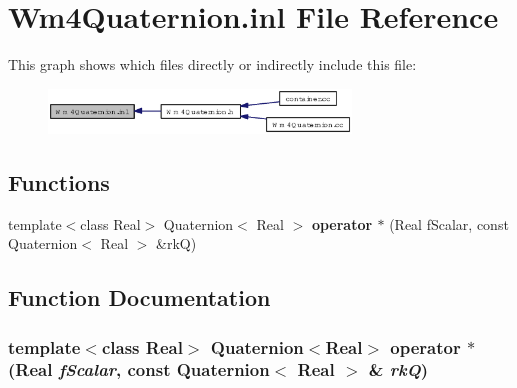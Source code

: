 \section{Wm4Quaternion.inl File Reference}
\label{Wm4Quaternion_8inl}


This graph shows which files directly or indirectly include this file:\begin{figure}[H]
\begin{center}
\leavevmode
\includegraphics[width=228pt]{Wm4Quaternion_8inl__dep__incl}
\end{center}
\end{figure}
\subsection*{Functions}
\begin{CompactItemize}
\item 
template$<$class Real$>$ Quaternion$<$ Real $>$ {\bf operator $\ast$} (Real f\-Scalar, const Quaternion$<$ Real $>$ \&rk\-Q)
\end{CompactItemize}


\subsection{Function Documentation}
\subsubsection{\setlength{\rightskip}{0pt plus 5cm}template$<$class Real$>$ Quaternion$<$Real$>$ operator $\ast$ (Real {\em f\-Scalar}, const Quaternion$<$ Real $>$ \& {\em rk\-Q})\hspace{0.3cm}{\tt  [inline]}}\label{Wm4Quaternion_8inl_7ec61a9de2604a1d8805da415d6a7f3d}



